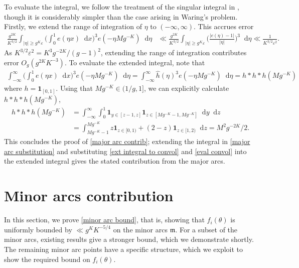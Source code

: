 \documentclass[hidelinks,11pt,reqno]{amsart}
\renewcommand{\geq}{\geqslant}
\newcommand{\ind}{\mathbf{1}}
\newcommand*\dif{\mathop{}\!\mathrm{d}}
\theoremstyle{remark}
\begin{document}
To evaluate the integral, we follow the treatment of the singular integral in \citep[Ch.~4]{davenport2005analytic}, though it is considerably simpler than the case arising in Waring's problem. 
Firstly, we extend the range of integration of $\eta$ to $(-\infty,\infty)$. This accrues error 
\begin{align}\label{eq: ext integration range}
  \frac{g^{2K}}{K^{3/2}} \int_{|\eta|\geq g^{K}\varepsilon}\big (\int_{0}^{1}e(\eta x)\dif x\big )^{3}e(-\eta M g^{-K})\dif \eta &\ll  \frac{g^{2K}}{K^{3/2}}\int_{|\eta|\geq g^{K}\varepsilon} \Big(\frac{|e(\eta)-1|}{|\eta|}\Big)^{3} \dif \eta\ll \frac{1}{K^{3/2}\varepsilon^{2}}.
\end{align}
As $K^{3/2}\varepsilon^{2}=K^{3}g^{-2K}/(g-1)^{2}$, extending the range of integration contributes error $O_{g}(g^{2K}K^{-3})$. To evaluate the extended integral, note that
\begin{align}\label{ext integral to convol}
    \int_{-\infty}^{\infty}\Big (\int_{0}^{1}e(\eta x)\dif x\Big )^{3}e(-\eta M g^{-K})\dif \eta=\int_{-\infty}^{\infty} \widehat{h}(\eta)^{3}e(-\eta M g^{-K})\dif \eta = h \ast h \ast h(Mg^{-K})
\end{align}
where $h=\ind_{[0,1]}$. Using that $Mg^{-K}\in(1/g,1]$, we can explicitly calculate $h*h*h(Mg^{-K})$,
\begin{align}
    h*h*h(Mg^{-K})&=\int_{-\infty}^{\infty}\int_{0}^{1}\ind_{y\in[z-1,z]}\ind_{z\in[Mg^{-K}-1,Mg^{-K}]}\dif y\dif z\nonumber\\
    &=\int_{Mg^{-K}-1}^{Mg^{-K}}z\ind_{z\in [0,1)}+(2-z)\ind_{z\in [1,2)}\dif z=M^{2}g^{-2K}/2.\label{eval convol}
\end{align}
This concludes the proof of \cref{major arc contrib}; extending the integral in \cref{major arc substitution} and substituting \cref{ext integral to convol} and \cref{eval convol} into the extended integral gives the stated contribution from the major arcs.

\section{Minor arcs contribution}\label{Section: minor arc}
In this section, we prove \cref{minor arc bound}, that is, showing that $f_{i}(\theta)$ is uniformly bounded by $\ll g^{K}K^{-5/4}$ on the minor arcs $\mathfrak{m}$. For a subset of the minor arcs, existing results give a stronger bound, which we demonstrate shortly. The remaining minor arc points have a specific structure, which we exploit to show the required bound on $f_{i}(\theta)$. 
\end{document}
